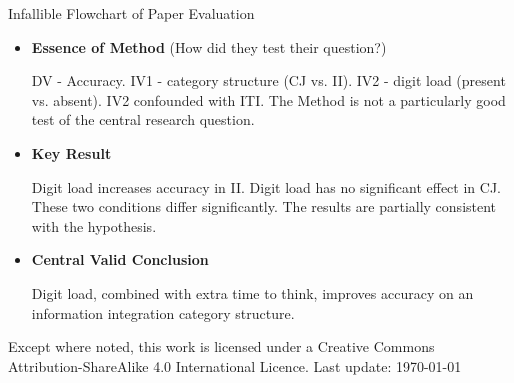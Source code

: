 \documentclass{beamer}
\begin{document}
\begin{frame}{Infallible Flowchart of Paper Evaluation}
\begin{itemize}

\item \textbf{Essence of Method} (How did they test their question?)
	 
  DV - Accuracy. IV1 - category structure (CJ vs. II). IV2 - digit
  load (present vs. absent).  IV2 confounded with ITI.  The Method is
  not a particularly good test of the central research question.
\item \textbf{Key Result}
	 
	 Digit load increases accuracy in II.
	 Digit load has no significant effect in CJ.
	 These two conditions differ significantly. 
	 The results are partially consistent with the hypothesis.
\item \textbf{Central Valid Conclusion}
	
  Digit load, combined with extra time to think, improves accuracy on
  an information integration category structure.
\end{itemize}

\tiny Except where noted, this work is licensed under a Creative
Commons Attribution-ShareAlike 4.0 International Licence. Last update:
\today

\end{frame}
\end{document}
